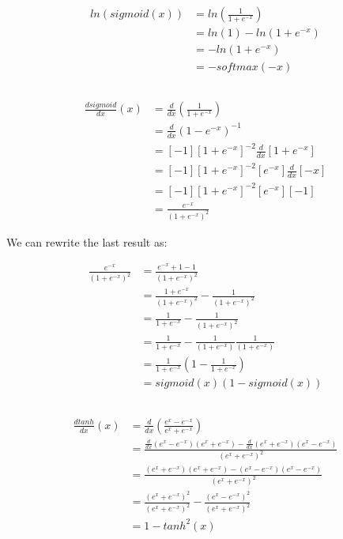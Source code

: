 \documentclass[reqno]{amsart}
\theoremstyle{definition}
\theoremstyle{remark}
\numberwithin{equation}{section}
\begin{document}
\subsection{}
\begin{align}
    ln(sigmoid(x)) &= ln(\frac{1}{1 + e^{-x}}) \\
    &= ln(1) - ln(1 + e^{-x}) \\
    &= -ln(1 + e^{-x}) \\
    &= -softmax(-x)
\end{align}

\subsection{}
\begin{align}
    \frac{dsigmoid}{dx}(x) &= \frac{d}{dx}(\frac{1}{1+e^{-x}}) \\
    &= \frac{d}{dx} (1 - e^{-x})^{-1} \\
    &= [-1][1 + e^{-x}]^{-2} \frac{d}{dx}[1 + e^{-x}] \\
    &= [-1][1 + e^{-x}]^{-2} [e^{-x}] \frac{d}{dx}[-x]\\
    &= [-1][1 + e^{-x}]^{-2} [e^{-x}] [-1] \\
    &= \frac{e^{-x}}{(1+ e^{-x})^{2}}
\end{align}

We can rewrite the last result as:

\begin{align}
    \frac{e^{-x}}{(1+ e^{-x})^{2}} &= \frac{e^{-x} +1 -1}{(1 + e^{-x})^2} \\
    &= \frac{1 + e^{-x}}{(1 + e^{-x})^2} - \frac{1}{(1 + e^{-x})^2} \\
    &= \frac{1}{1 + e^{-x}}  - \frac{1}{(1 + e^{-x})^2}\\
    &= \frac{1}{1 + e^{-x}} - \frac{1}{(1 + e^{-x})}\frac{1}{(1 + e^{-x})}\\
    &= \frac{1}{1 + e^{-x}} (1- \frac{1}{1 + e^{-x}})\\
    &= sigmoid(x)(1 - sigmoid(x))
\end{align}

\subsection{}

\begin{align}
    \frac{dtanh}{dx}(x) &= \frac{d}{dx}(\frac{e^x-e^{-x}}{e^x+e^{-x}}) \\
    &= \frac{\frac{d}{dx}(e^x-e^{-x})(e^x+e^{-x}) -  \frac{d}{dx}(e^x+e^{-x})(e^x-e^{-x})}{(e^x+e^{-x})^2} \\
    &= \frac{(e^x+e^{-x})(e^x+e^{-x}) - (e^x-e^{-x})(e^x-e^{-x})}{(e^x+e^{-x})^2}\\
    &= \frac{(e^x+e^{-x})^2}{(e^x+e^{-x})^2} - \frac{(e^x-e^{-x})^2}{(e^x+e^{-x})^2}\\
    &= 1- tanh^2(x)
\end{align}
\end{document}
